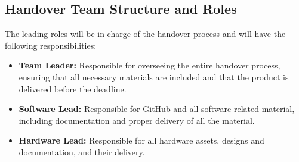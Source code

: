

\subsection{Handover Team Structure and Roles}
\label{subsection:handover_team_structure_and_roles}

The leading roles will be in charge of the handover process and will have the following responsibilities:
\begin{itemize}
    \item \textbf{Team Leader:} Responsible for overseeing the entire handover process, ensuring that all necessary materials are included and that the product is delivered before the deadline.
    \item \textbf{Software Lead:} Responsible for GitHub and all software related material, including documentation and proper delivery of all the material. 
    \item \textbf{Hardware Lead:} Responsible  for all hardware assets, designs and documentation, and their delivery.
\end{itemize}

